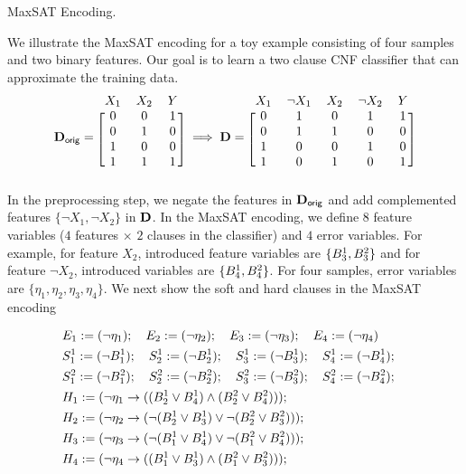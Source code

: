 \begin{example}{MaxSAT Encoding.}
\normalfont

We illustrate the MaxSAT encoding for a toy example consisting of four samples and two binary features. Our goal is to learn a two clause CNF classifier that can approximate the training data. 
\[ 
\dataset_\mathsf{orig} = 
\begin{blockarray}{ccc}
X_1 & X_2 & Y\\
\begin{block}{[ccc]}
0 & 0 & 1\\
0 & 1 & 0\\
1 & 0 & 0\\
1 & 1 & 1\\
\end{block}
\end{blockarray} \implies 
\dataset = 
\begin{blockarray}{ccccc}
X_1 & \neg X_1 & X_2  & \neg X_2 & Y\\
\begin{block}{[ccccc]}
0 & 1 & 0 & 1 & 1\\
0 & 1 & 1 & 0 & 0\\
1 & 0 & 0 & 1 & 0\\
1 & 0 & 1 & 0 & 1\\
\end{block}
\end{blockarray}
\]
In the preprocessing step, we negate the features in $ \mathbf{D}_\mathsf{orig} $ and add complemented features $ \{\neg X_1, \neg X_2\} $ in $ \mathbf{D} $. In the MaxSAT encoding, we define $ 8 $ feature variables ($ 4 $ features $ \times $ $ 2 $ clauses in the classifier) and $ 4 $ error variables. For example, for feature $ X_2 $, introduced feature variables are $ \{B^1_3, B^2_3\} $ and for feature $ \neg X_2 $, introduced variables are $ \{B^1_4, B^2_4\} $. For four samples, error variables are $ \{\eta_1, \eta_2, \eta_3, \eta_4\} $. We next show the soft and hard clauses in the MaxSAT encoding


\[
\begin{split}
&E_1:= (\neg \eta_1); \quad
E_2:= (\neg \eta_2); \quad E_3:= (\neg \eta_3); \quad
E_4:= (\neg \eta_4)\\
& S_1^1 := (\neg B_1^1);\quad 
 S^1_2 := (\neg B^1_2);\quad 
 S^1_3 := (\neg B^1_3);\quad
 S^1_4 := (\neg B^1_4);\quad \\ 
& S_1^2 := (\neg B_1^2);\quad 
S^2_2 := (\neg B^2_2);\quad 
S^2_3 := (\neg B^2_3);\quad 
S^2_4 := (\neg B^2_4);\quad\\ 
& H_1:= (\neg \eta_1 \rightarrow ((B_2^1 \vee B_4^1)\wedge (B_2^2 \vee B_4^2)));\\
& H_2:= (\neg \eta_2 \rightarrow (\neg(B_2^1 \vee B_3^1) \vee \neg(B_2^2 \vee B_3^2)));\\
& H_3:= (\neg \eta_3 \rightarrow (\neg (B_1^1 \vee B_4^1) \vee \neg(B_1^2 \vee B_4^2)));\\
& H_4:= (\neg \eta_4 \rightarrow ((B_1^1 \vee B_3^1) \wedge (B_1^2 \vee B_3^2)));\\
\end{split}
\]


\end{example}

